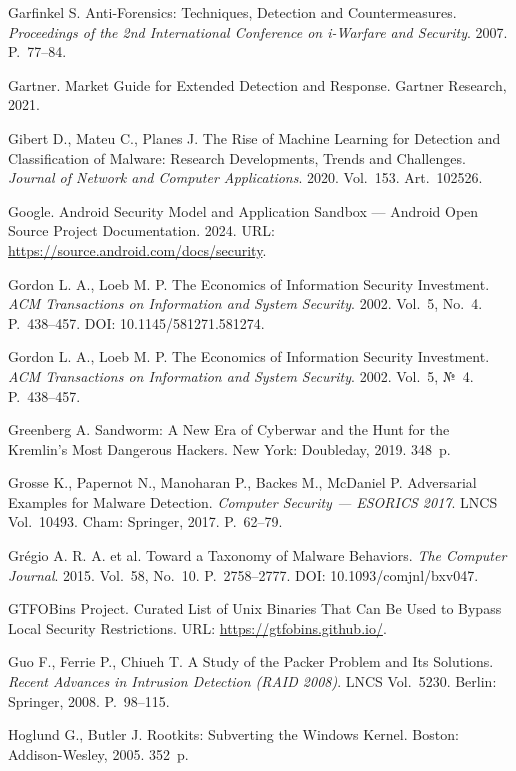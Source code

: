  Garfinkel S. Anti-Forensics: Techniques, Detection and Countermeasures. \emph{Proceedings of the 2nd International Conference on i-Warfare and Security}. 2007. P.~77--84.

 Gartner. Market Guide for Extended Detection and Response. Gartner Research, 2021.

 Gibert D., Mateu C., Planes J. The Rise of Machine Learning for Detection and Classification of Malware: Research Developments, Trends and Challenges. \emph{Journal of Network and Computer Applications}. 2020. Vol.~153. Art.~102526.

 Google. Android Security Model and Application Sandbox --- Android Open Source Project Documentation. 2024. URL: \url{https://source.android.com/docs/security}.

 Gordon L. A., Loeb M. P. The Economics of Information Security Investment. \emph{ACM Transactions on Information and System Security}. 2002. Vol.~5, No.~4. P.~438--457. DOI: 10.1145/581271.581274.

 Gordon L. A., Loeb M. P. The Economics of Information Security Investment. \emph{ACM Transactions on Information and System Security}. 2002. Vol.~5, №~4. P.~438--457.

 Greenberg A. Sandworm: A New Era of Cyberwar and the Hunt for the Kremlin's Most Dangerous Hackers. New York: Doubleday, 2019. 348~p.

 Grosse K., Papernot N., Manoharan P., Backes M., McDaniel P. Adversarial Examples for Malware Detection. \emph{Computer Security --- ESORICS 2017}. LNCS Vol.~10493. Cham: Springer, 2017. P.~62--79.

 Grégio A. R. A. et al. Toward a Taxonomy of Malware Behaviors. \emph{The Computer Journal}. 2015. Vol.~58, No.~10. P.~2758--2777. DOI: 10.1093/comjnl/bxv047.

 GTFOBins Project. Curated List of Unix Binaries That Can Be Used to Bypass Local Security Restrictions. URL: \url{https://gtfobins.github.io/}.

 Guo F., Ferrie P., Chiueh T. A Study of the Packer Problem and Its Solutions. \emph{Recent Advances in Intrusion Detection (RAID 2008)}. LNCS Vol.~5230. Berlin: Springer, 2008. P.~98--115.

 Hoglund G., Butler J. Rootkits: Subverting the Windows Kernel. Boston: Addison-Wesley, 2005. 352~p.

